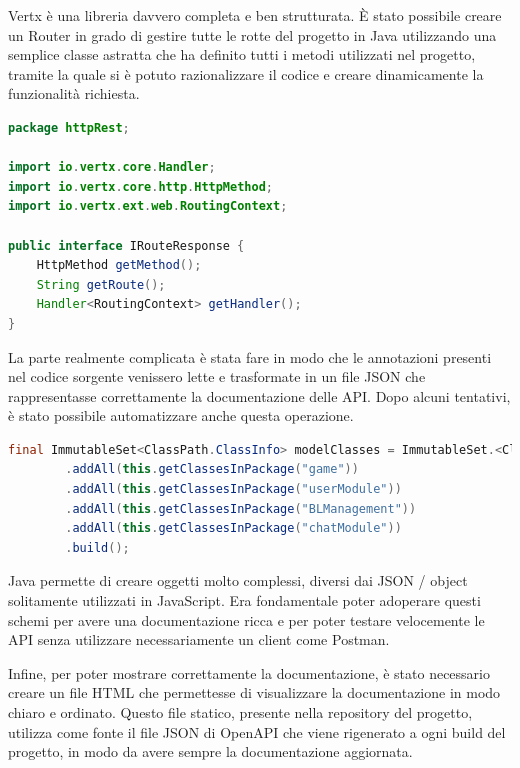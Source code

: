 Vertx è una libreria davvero completa e ben strutturata. È stato possibile creare un Router in grado di gestire tutte le rotte del progetto in Java utilizzando una semplice classe astratta che ha definito tutti i metodi utilizzati nel progetto, tramite la quale si è potuto razionalizzare il codice e creare dinamicamente la funzionalità richiesta.

\begin{lstlisting}[language=Java, caption={Semplice interfaccia per le rotte HTTP}, label=list:java_swagger_interface]
package httpRest;

import io.vertx.core.Handler;
import io.vertx.core.http.HttpMethod;
import io.vertx.ext.web.RoutingContext;

public interface IRouteResponse {
    HttpMethod getMethod();
    String getRoute();
    Handler<RoutingContext> getHandler();
}
\end{lstlisting}

La parte realmente complicata è stata fare in modo che le annotazioni presenti nel codice sorgente venissero lette e trasformate in un file JSON che rappresentasse correttamente la documentazione delle API. 
Dopo alcuni tentativi, è stato possibile automatizzare anche questa operazione.

\begin{lstlisting}[language=Java, caption={Aggiunta dei moduli delle classi contenenti rotte HTTP}, label=list:java_swagger_modules]
final ImmutableSet<ClassPath.ClassInfo> modelClasses = ImmutableSet.<ClassPath.ClassInfo>builder()
        .addAll(this.getClassesInPackage("game"))
        .addAll(this.getClassesInPackage("userModule"))
        .addAll(this.getClassesInPackage("BLManagement"))
        .addAll(this.getClassesInPackage("chatModule"))
        .build();
\end{lstlisting}

\vspace{1cm}

Java permette di creare oggetti molto complessi, diversi dai JSON / object solitamente utilizzati in JavaScript. Era fondamentale poter adoperare questi schemi per avere una documentazione ricca e per poter testare velocemente le API senza utilizzare necessariamente un client come Postman. 

Infine, per poter mostrare correttamente la documentazione, è stato necessario creare un file HTML che permettesse di visualizzare la documentazione in modo chiaro e ordinato. Questo file statico, presente nella repository del progetto, utilizza come fonte il file JSON di OpenAPI che viene rigenerato a ogni build del progetto, in modo da avere sempre la documentazione aggiornata.

